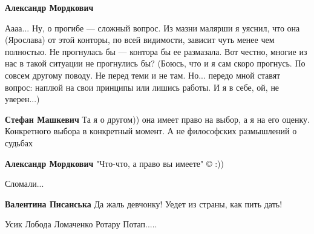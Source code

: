 \begin{itemize}
\begin{itemize}
\textbf{Александр Мордкович} 

\obeycr
Аааа...
Ну, о прогибе — сложный вопрос.
Из мазни малярши я уяснил, что она (Ярослава) от этой конторы, по всей видимости, зависит чуть менее чем полностью.
Не прогнулась бы — контора бы ее размазала.
Вот честно, многие из нас в такой ситуации не прогнулись бы?
(Боюсь, что и я сам скоро прогнусь. По совсем другому поводу. Не перед теми и не там. Но... передо мной ставят вопрос: наплюй на свои принципы или лишись работы. И я в себе, ой, не уверен...)
\restorecr


 
\textbf{Стефан Машкевич} Та я о другом)) она имеет право на выбор, а я на его оценку. Конкретного выбора в конкретный момент. А не философских размышлений о судьбах

 
\textbf{Александр Мордкович} "Что-что, а право вы имеете" © :))

\end{itemize}

 
Сломали...

\begin{itemize}

 
\textbf{Валентина Писанська} Да жаль девчонку! Уедет из страны, как пить дать!
\end{itemize}

 
Усик
Лобода
Ломаченко
Ротару
Потап.....


\end{itemize}
